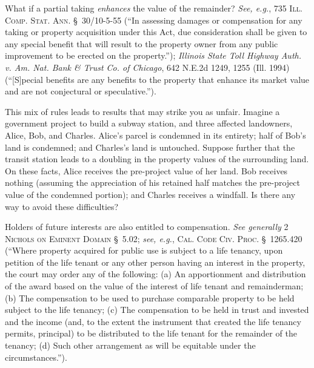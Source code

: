 What if a partial taking \textit{enhances} the value of the remainder?
\textit{See, e.g.}, 735 \textsc{Ill. Comp. Stat. Ann.} \S~30/10-5-55 (``In
assessing damages or compensation for any taking or property acquisition under
this Act, due consideration shall be given to any special benefit that will
result to the property owner from any public improvement to be erected on the
property.''); \emph{Illinois State Toll Highway Auth. v. Am. Nat. Bank \& Trust
Co. of Chicago}, 642 N.E.2d 1249, 1255 (Ill. 1994) (``[S]pecial benefits are any
benefits to the property that enhance its market value and are not conjectural
or speculative.''). 

This mix of rules leads to results that may strike you as unfair. Imagine a
government project to build a subway station, and three affected landowners,
Alice, Bob, and Charles. Alice's parcel is condemned in its entirety; half of
Bob's land is condemned; and Charles's land is untouched. Suppose further that
the transit station leads to a doubling in the property values of the
surrounding land. On these facts, Alice receives the pre-project value of her
land. Bob receives nothing (assuming the appreciation of his retained half
matches the pre-project value of the condemned portion); and Charles receives a
windfall. Is there any way to avoid these difficulties?

Holders of future interests are also entitled to compensation. \textit{See
generally} 2 \textsc{Nichols on Eminent Domain} \S~5.02; \textit{see, e.g.},
\textsc{Cal. Code Civ. Proc.} \S~1265.420 (``Where property acquired for public
use is subject to a life tenancy, upon petition of the life tenant or any other
person having an interest in the property, the court may order any of the
following: (a) An apportionment and distribution of the award based on the value
of the interest of life tenant and remainderman; (b) The compensation to be used
to purchase comparable property to be held subject to the life tenancy; (c) The
compensation to be held in trust and invested and the income (and, to the extent
the instrument that created the life tenancy permits, principal) to be
distributed to the life tenant for the remainder of the tenancy; (d) Such other
arrangement as will be equitable under the circumstances.''). 

